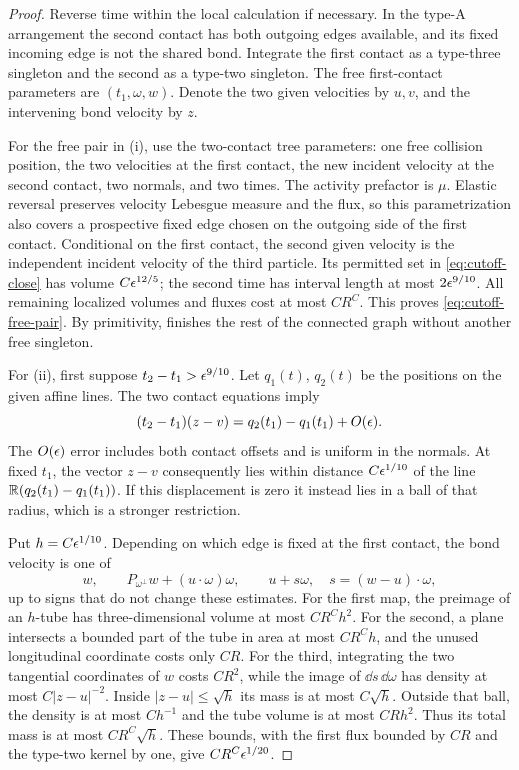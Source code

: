 \begin{proof}
Reverse time within the local calculation if necessary.  In the
type-A arrangement the second contact has both outgoing edges
available, and its fixed incoming edge is not the shared bond.
Integrate the first contact as a type-three singleton and the second
as a type-two singleton.  The free first-contact parameters are
\((t_1,\omega,w)\).  Denote the two given velocities by \(u,v\),
and the intervening bond velocity by \(z\).

For the free pair in (i), use the two-contact tree parameters:
one free collision position, the two velocities at the first
contact, the new incident velocity at the second contact, two
normals, and two times.  The activity prefactor is \(\mu\).
Elastic reversal preserves velocity Lebesgue measure and the flux,
so this parametrization also covers a prospective fixed edge
chosen on the outgoing side of the first contact.  Conditional on
the first contact, the second given velocity is the independent
incident velocity of the third particle.  Its permitted set in
\eqref{eq:cutoff-close} has volume \(C\epsilon^{12/5}\); the second
time has interval length at most \(2\epsilon^{9/10}\).
All remaining localized volumes and fluxes cost at most \(CR^C\).
This proves \eqref{eq:cutoff-free-pair}.  By primitivity,
 finishes the rest of the connected graph
without another free singleton.

For (ii), first suppose \(t_2-t_1>\epsilon^{9/10}\).
Let \(q_1(t)\), \(q_2(t)\) be the positions on the given affine
lines.  The two contact equations imply
\begin{equation}\label{eq:cutoff-aiming}
 (t_2-t_1)(z-v)=q_2(t_1)-q_1(t_1)+O(\epsilon).
\end{equation}
The \(O(\epsilon)\) error includes both contact offsets and is uniform
in the normals.  At fixed \(t_1\), the vector \(z-v\) consequently
lies within distance \(C\epsilon^{1/10}\) of the line
\(\mathbb R(q_2(t_1)-q_1(t_1))\).  If this displacement is zero it instead
lies in a ball of that radius, which is a stronger restriction.

Put \(h=C\epsilon^{1/10}\).  Depending on which edge is fixed at the
first contact, the bond velocity is one of
\[
 w,\qquad
 P_{\omega^\perp}w+(u\cdot\omega)\omega,\qquad
 u+s\omega,\quad s=(w-u)\cdot\omega ,
\]
up to signs that do not change these estimates.
For the first map, the preimage of an \(h\)-tube has
three-dimensional volume at most \(CR^C h^2\).
For the second, a plane intersects a bounded part of the tube
in area at most \(CR^C h\), and the unused longitudinal
coordinate costs only \(CR\).
For the third, integrating the two tangential coordinates of \(w\)
costs \(CR^2\), while the image of \(\dd s\,\dd\omega\) has
density at most \(C|z-u|^{-2}\).
Inside \(|z-u|\leq\sqrt h\) its mass is at most \(C\sqrt h\).
Outside that ball, the density is at most \(Ch^{-1}\) and the
tube volume is at most \(CRh^2\).
Thus its total mass is at most \(CR^C\sqrt h\).
These bounds, with the first flux bounded by \(CR\) and the
type-two kernel by one, give \(CR^C\epsilon^{1/20}\).


\end{proof}
